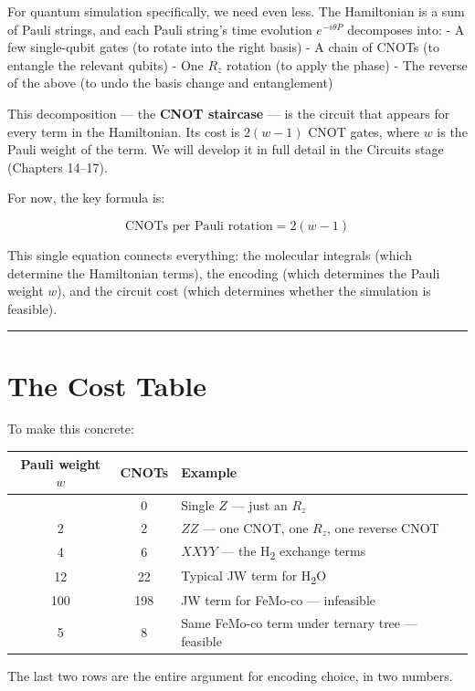 \documentclass[
  11pt,
  oneside]{book}
\begin{document}
For quantum simulation specifically, we need even less. The Hamiltonian
is a sum of Pauli strings, and each Pauli string's time evolution
\(e^{-i\theta P}\) decomposes into: - A few single-qubit gates (to
rotate into the right basis) - A chain of CNOTs (to entangle the
relevant qubits) - One \(R_z\) rotation (to apply the phase) - The
reverse of the above (to undo the basis change and entanglement)

This decomposition --- the \textbf{CNOT staircase} --- is the circuit
that appears for every term in the Hamiltonian. Its cost is \(2(w-1)\)
CNOT gates, where \(w\) is the Pauli weight of the term. We will develop
it in full detail in the Circuits stage (Chapters 14--17).

For now, the key formula is:

\[\boxed{\text{CNOTs per Pauli rotation} = 2(w - 1)}\]

This single equation connects everything: the molecular integrals (which
determine the Hamiltonian terms), the encoding (which determines the
Pauli weight \(w\)), and the circuit cost (which determines whether the
simulation is feasible).

\begin{center}\rule{0.5\linewidth}{0.5pt}\end{center}

\section{The Cost Table}\label{the-cost-table}

To make this concrete:

\begin{longtable}[]{@{}ccl@{}}
\toprule\noalign{}
Pauli weight \(w\) & CNOTs & Example \\
\midrule\noalign{}
\endhead
\bottomrule\noalign{}
\endlastfoot
1 & 0 & Single \(Z\) --- just an \(R_z\) \\
2 & 2 & \(ZZ\) --- one CNOT, one \(R_z\), one reverse CNOT \\
4 & 6 & \(XXYY\) --- the H\textsubscript{2} exchange terms \\
12 & 22 & Typical JW term for H\textsubscript{2}O \\
100 & 198 & JW term for FeMo-co --- infeasible \\
5 & 8 & Same FeMo-co term under ternary tree --- feasible \\
\end{longtable}

The last two rows are the entire argument for encoding choice, in two
numbers.
\end{document}
